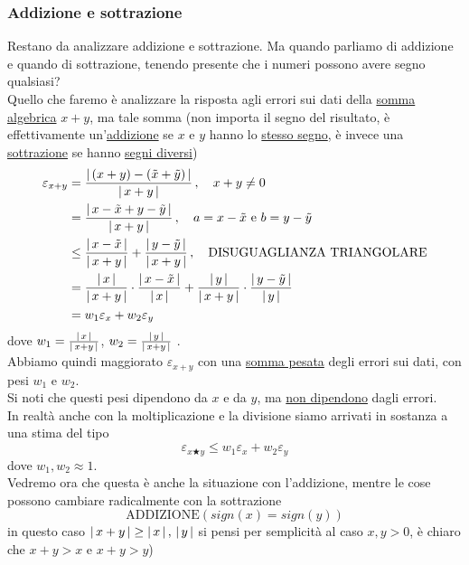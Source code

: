 \subsubsection{Addizione e sottrazione}
Restano da analizzare addizione e sottrazione. Ma quando parliamo di addizione e quando di sottrazione, tenendo presente che i numeri possono avere segno qualsiasi?\\
Quello che faremo è analizzare la risposta agli errori sui dati della \uline{somma algebrica} $x + y$, ma tale somma (non importa il segno del risultato, è effettivamente un'\uline{addizione} se $x$ e $y$ hanno lo \uline{stesso segno}, è invece una \uline{sottrazione} se hanno \uline{segni diversi})
\[\begin{split}
    \varepsilon_{x+y} & = \frac{\abs*{\,(x + y) - (\Tilde{x} + \Tilde{y})\,}}{\abs*{\,x + y\,}} \,, \quad x + y \ne 0 \\
    & = \frac{\abs*{\,x - \Tilde{x} + y - \Tilde{y}\,}}{\abs*{\,x + y\,}} \,, \quad a = x - \Tilde{x} \text{ e } b = y - \Tilde{y} \\
    & \le \frac{\abs*{\,x - \Tilde{x}\,}}{\abs*{\,x + y\,}} + \frac{\abs*{\,y - \Tilde{y}\,}}{\abs*{\,x + y\,}} \,, \quad \text{DISUGUAGLIANZA TRIANGOLARE} \\
    & = \frac{\abs*{\,x\,}}{\abs*{\,x + y\,}} \cdot \frac{\abs*{\,x - \Tilde{x}\,}}{\abs*{\,x\,}} + \frac{\abs*{\,y\,}}{\abs*{\,x + y\,}} \cdot \frac{\abs*{\,y - \Tilde{y}\,}}{\abs*{\,y\,}} \\
    & = w_1 \varepsilon_x + w_2 \varepsilon_y
\end{split}\]
dove $w_1 = \frac{\abs*{\,x\,}}{\abs*{\,x + y\,}}$, $w_2 = \frac{\abs*{\,y\,}}{\abs*{\,x + y\,}}$ .\\
Abbiamo quindi maggiorato $\varepsilon_{x+y}$ con una \uline{somma pesata} degli errori sui dati, con pesi $w_1$ e $w_2$.\\
Si noti che questi pesi dipendono da $x$ e da $y$, ma \uline{non dipendono} dagli errori.\\
In realtà anche con la moltiplicazione e la divisione siamo arrivati in sostanza a una stima del tipo
\[\varepsilon_{x \bigstar y} \le w_1 \varepsilon_x + w_2 \varepsilon_y\]
dove $w_1, w_2 \approx 1$. \\
Vedremo ora che questa è anche la situazione con l'addizione, mentre le cose possono cambiare radicalmente con la sottrazione \\
\[\text{ADDIZIONE} (sign(x) = sign(y))\]
in questo caso $\abs{\,x + y\,} \ge \abs{\,x\,}\,,\,\abs{\,y\,}$ si pensi per semplicità al caso $x,y > 0$, è chiaro che $x + y > x$ e $x + y > y$) \\
